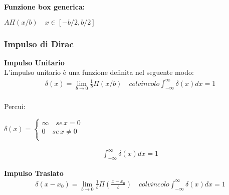     \noindent
    \textbf{Funzione box generica:}\\
    \begin{minipage}{.5\textwidth}
        $A\Pi(x/b)\quad x\in[-b/2,b/2]$\\
    \end{minipage}
    \begin{minipage}{.15\textwidth}
    \end{minipage}
    \subsubsection{Impulso di Dirac}
    \textbf{Impulso Unitario}\\
    L'impulso unitario è una funzione definita nel seguente modo:
    \begin{align*}
        \delta(x)=\lim_{b\to 0} \frac{1}{b}\Pi(x/b)\quad colvincolo \int_{-\infty}^{\infty} \delta(x)dx=1
    \end{align*}\\
    
    \noindent
    Percui:\\[0.2cm]
    \begin{minipage}{.5\textwidth}
        $\delta(x)=\begin{cases}
        \infty\quad se \, x=0\\
        0 \quad se \, x\neq 0\\
    \end{cases}$
    \end{minipage}
    \begin{minipage}{.5\textwidth}
        \begin{align*}
            \int_{-\infty}^{\infty} \delta(x)dx=1
        \end{align*}
    \end{minipage}
    \vspace{0.3cm}
    
    \noindent
    \textbf{Impulso Traslato}\\
    \begin{align*}
        \delta(x-x_0)=\lim_{b\to 0} \frac{1}{b}\Pi(\frac{x-x_0}{b})\quad col vincolo \int_{-\infty}^{\infty} \delta(x)dx=1
    \end{align*}
    \vspace{0.3cm}
    
